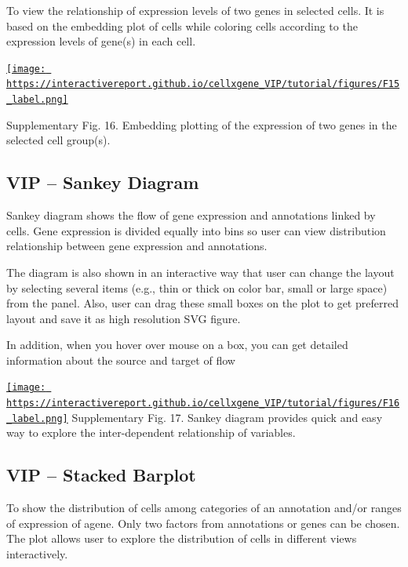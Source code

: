 \documentclass[
]{article}
\begin{document}
To view the relationship of expression levels of two genes in selected cells. It is based on the embedding plot of cells while coloring cells according to the expression levels of gene(s) in each cell.

\href{https://interactivereport.github.io/cellxgene_VIP/tutorial/figures/F15_label.png}{\texttt{[image: https://interactivereport.github.io/cellxgene\_VIP/tutorial/figures/F15\_label.png]}}

Supplementary Fig. 16. Embedding plotting of the expression of two genes in the selected cell group(s).

\hypertarget{vip-sankey-diagram}{%
\subsection{VIP -- Sankey Diagram}\label{vip-sankey-diagram}}

Sankey diagram shows the flow of gene expression and annotations linked by cells. Gene expression is divided equally into bins so user can view distribution relationship between gene expression and annotations.

The diagram is also shown in an interactive way that user can change the layout by selecting several items (e.g., thin or thick on color bar, small or large space) from the panel. Also, user can drag these small boxes on the plot to get preferred layout and save it as high resolution SVG figure.

In addition, when you hover over mouse on a box, you can get detailed information about the source and target of flow

\href{https://interactivereport.github.io/cellxgene_VIP/tutorial/figures/F16_label.png}{\texttt{[image: https://interactivereport.github.io/cellxgene\_VIP/tutorial/figures/F16\_label.png]}}
Supplementary Fig. 17. Sankey diagram provides quick and easy way to explore the inter-dependent relationship of variables.

\hypertarget{vip-stacked-barplot}{%
\subsection{VIP -- Stacked Barplot}\label{vip-stacked-barplot}}

To show the distribution of cells among categories of an annotation and/or ranges of expression of agene. Only two factors from annotations or genes can be chosen. The plot allows user to explore the distribution of cells in different views interactively.
\end{document}
